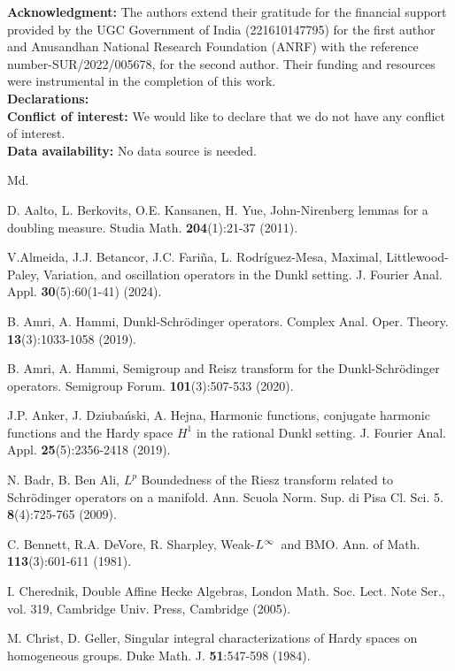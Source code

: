 \documentclass[11pt, reqno]{amsproc}
\theoremstyle{definition}
\theoremstyle{remark}
\numberwithin{equation}{section}
\begin{document}
\noindent\textbf{Acknowledgment:}
      The authors extend their gratitude for the financial support provided by the UGC Government of India (221610147795) for the first author and Anusandhan National Research Foundation (ANRF) with the reference number-SUR/2022/005678, for the second author. Their funding and resources were instrumental in the completion of this work.   \\
\textbf{Declarations:}
\\
\textbf{Conflict of interest:}
We would like to declare that we do not have any conflict of interest.
\\
\textbf{Data availability:} No data source is needed.
 \begin{thebibliography}{Md.}
 
 D. Aalto, L. Berkovits, O.E. Kansanen, H. Yue, John-{N}irenberg lemmas for a doubling measure. Studia Math. \textbf{204}(1):21-37 (2011). 

 V.Almeida, J.J. Betancor, J.C. Fariña, L. Rodr\'iguez-Mesa, Maximal, Littlewood-Paley, Variation, and oscillation operators in the Dunkl setting. J. Fourier Anal. Appl. \textbf{30}(5):60(1-41) (2024).
 
B. Amri, A. Hammi,  Dunkl-Schr\"odinger operators. Complex Anal. Oper. Theory. \textbf{13}(3):1033-1058 (2019).

B. Amri, A. Hammi, Semigroup and Reisz transform for the Dunkl-Schr\"odinger operators. Semigroup Forum. \textbf{101}(3):507-533 (2020).

J.P. Anker, J. Dziuba\'nski, A.  Hejna,  Harmonic functions, conjugate harmonic functions and the {H}ardy space {$H^1$} in the rational {D}unkl setting. J. Fourier Anal. Appl. \textbf{25}(5):2356-2418 (2019).

N. Badr, B. Ben Ali, $L^p$ Boundedness of the Riesz transform related to Schr\"odinger operators on a manifold. Ann. Scuola Norm. Sup. di Pisa Cl. Sci. 5. \textbf{8}(4):725-765 (2009).

C. Bennett, R.A. DeVore, R. Sharpley, 
Weak-{$L\sp{\infty }$}\ and {BMO}. Ann. of Math. \textbf{113}(3):{601-611} (1981).



 I. Cherednik, Double Affine Hecke Algebras, London Math. Soc. Lect. Note Ser., vol. 319, Cambridge Univ. Press, Cambridge (2005).

M. Christ, D. Geller, Singular integral characterizations of Hardy spaces on homogeneous groups. Duke Math. J. \textbf{51}:547-598 (1984).



\end{thebibliography}
\end{document}
